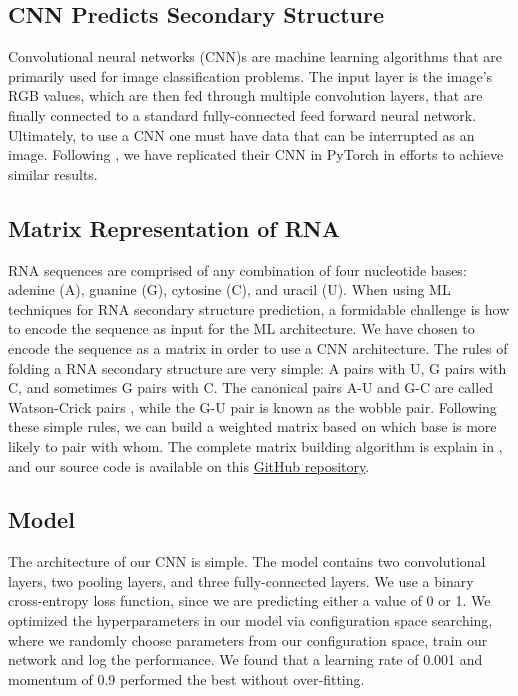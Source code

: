 \documentclass[11pt]{article}
\begin{document}
\begin{multicols}{2}
\section{CNN Predicts Secondary Structure}
Convolutional neural networks (CNN)s are machine learning algorithms that are primarily used for image classification problems. The input layer is the image’s RGB values, which are then fed through multiple convolution layers, that are finally connected to a standard fully-connected feed forward neural network. Ultimately, to use a CNN one must have data that can be interrupted as an image. Following \cite{10.3389/fgene.2019.00467}, we have replicated their CNN in PyTorch \cite{paszke2017automatic} in efforts to achieve similar results.


\subsection{Matrix Representation of RNA}

RNA sequences are comprised of any combination of four nucleotide bases: adenine (A), guanine (G), cytosine (C), and uracil (U). When using ML techniques for RNA secondary structure prediction, a formidable challenge is how to encode the sequence as input for the ML architecture. We have chosen to encode the sequence as a matrix in order to use a CNN architecture. The rules of folding a RNA secondary structure are very simple: A pairs with U, G pairs with C, and sometimes G pairs with C. The canonical pairs A-U and G-C are called Watson-Crick pairs \cite{Cleaves2011}, while the G-U pair is known as the wobble pair. Following these simple rules, we can build a weighted matrix based on which base is more likely to pair with whom. The complete matrix building algorithm is explain in \cite{10.3389/fgene.2019.00467}, and our source code is available on this \href{https://github.com/harrisonlabollita/RNA-ML/blob/master/src/explore/cnn%20code/rna2matrix.py}{GitHub repository}.

\subsection{Model}

The architecture of our CNN is simple. The  model contains two convolutional layers, two pooling layers, and three fully-connected layers. We use a binary cross-entropy loss function, since we are predicting either a value of 0 or 1. We optimized the hyperparameters in our model via configuration space searching, where we randomly choose parameters from our configuration space, train our network and log the performance. We found that a learning rate of 0.001 and momentum of 0.9 performed the best without over-fitting.


\end{multicols}
\end{document}
